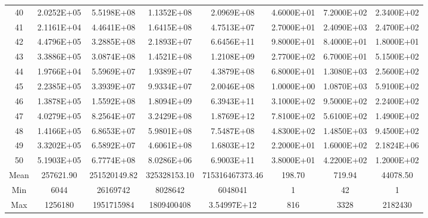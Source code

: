 \documentclass[11pt]{scrartcl}
\theoremstyle{dotlessP}
\theoremstyle{dotlessN}
\theoremstyle{dotN}
\begin{document}
\begin{table}[H]
{\begin{tabular}{c|c|c|c|c|c|c|c}
40            & 2.0252E+05  & 5.5198E+08      & 1.1352E+08    & 2.0969E+08          & 4.6000E+01         & 7.2000E+02       & 2.3400E+02             \\
41            & 2.1161E+04  & 4.4641E+08      & 1.6415E+08    & 4.7513E+07          & 2.7000E+01         & 2.4090E+03       & 2.4700E+02             \\
42            & 4.4796E+05  & 3.2885E+08      & 2.1893E+07    & 6.6456E+11          & 9.8000E+01         & 8.4000E+01       & 1.8000E+01             \\
43            & 3.3886E+05  & 3.0874E+08      & 1.4521E+08    & 1.2108E+09          & 2.7700E+02         & 6.7000E+01       & 5.1500E+02             \\
44            & 1.9766E+04  & 5.5969E+07      & 1.9389E+07    & 4.3879E+08          & 6.8000E+01         & 1.3080E+03       & 2.5600E+02             \\
45            & 2.2385E+05  & 3.3939E+07      & 9.9334E+07    & 2.0046E+08          & 1.0000E+00         & 1.0870E+03       & 5.9100E+02             \\
46            & 1.3878E+05  & 1.5592E+08      & 1.8094E+09    & 6.3943E+11          & 3.1000E+02         & 9.5000E+02       & 2.2400E+02             \\
47            & 4.0279E+05  & 8.2564E+07      & 3.2429E+08    & 1.8769E+12          & 7.8100E+02         & 5.6100E+02       & 1.4900E+02             \\
48            & 1.4166E+05  & 6.8653E+07      & 5.9801E+08    & 7.5487E+08          & 4.8300E+02         & 1.4850E+03       & 9.4500E+02             \\
49            & 3.3202E+05  & 6.5892E+07      & 4.6061E+08    & 1.6803E+12          & 2.2000E+01         & 1.6000E+02       & 2.1824E+06             \\
50            & 5.1903E+05  & 6.7774E+08      & 8.0286E+06    & 6.9003E+11          & 3.8000E+01         & 4.2200E+02       & 1.2000E+02             \\
\hline
Mean          & 257621.90   & 251520149.82    & 325328153.10  & 715316467373.46     & 198.70             & 719.94           & 44078.50               \\
Min           & 6044        & 26169742        & 8028642       & 6048041             & 1                  & 42               & 1                      \\
Max           & 1256180     & 1951715984      & 1809400408    & 3.54997E+12         & 816                & 3328             & 2182430                \\

\end{tabular}}
\end{table}
\end{document}
